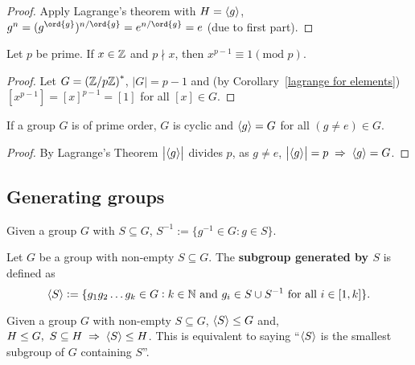 \documentclass[../Year1.tex]{subfiles}
\begin{document}
\begin{proof}
    Apply Lagrange's theorem with $H=\left\langle g \right\rangle$, $g^n = {(g^{\ord{g}})^{n/\ord{g}}}=e^{n/\ord{g}}=e$ (due to first part).
\end{proof}

\begin{corollary}
    Let $p$ be prime. If $x\in\mathbb{Z}$ and $p\nmid x$, then $x^{p-1}\equiv 1 (\text{mod }p)$.
\end{corollary}

\begin{proof}
    Let $G={(\mathbb{Z}/p\mathbb{Z})}^*$, $|G|=p-1$ and (by Corollary~\ref{lagrange for elements}) $[x^{p-1}]={[x]}^{p-1}=[1]$ for all $[x]\in G$.
\end{proof}

\begin{corollary}
    If a group $G$ is of prime order, $G$ is cyclic and $\left\langle g \right\rangle=G$ for all $(g\neq e)\in G$.
\end{corollary}

\begin{proof}
    By Lagrange's Theorem $\left|\left\langle g \right\rangle\right|$ divides $p$, as $g\neq e$, $\aabr{g}=p\implies \abr{g}=G$.
\end{proof}

\subsection{Generating groups}

\begin{definition}
    Given a group $G$ with $S\subseteq G$, $S^{-1}:=\{g^{-1}\in G:g\in S\}$.
\end{definition}

\begin{definition}
    Let $G$ be a group with non-empty $S\subseteq G$. The \textbf{subgroup generated by $S$} is defined as \[
        \abr{S} := \{g_1g_2\ldots g_k\in G: k\in\NN \ \text{\textcolor{black}{and }} g_i\in S\cup S^{-1} \ \text{\textcolor{black}{for all }} i\in[1,k]\}
        \textcolor{black}{.}
    \]
\end{definition}

\vspace{-30pt}

\begin{lemma}
    Given a group $G$ with non-empty $S\subseteq G$, $\left\langle S \right\rangle\leq G$ and, $H\leq G, \ S\subseteq H \implies \abr{S} \leq H$. This is equivalent to saying ``$\left\langle S \right\rangle$ is the smallest subgroup of $G$ containing $S$''.
\end{lemma}
\end{document}
